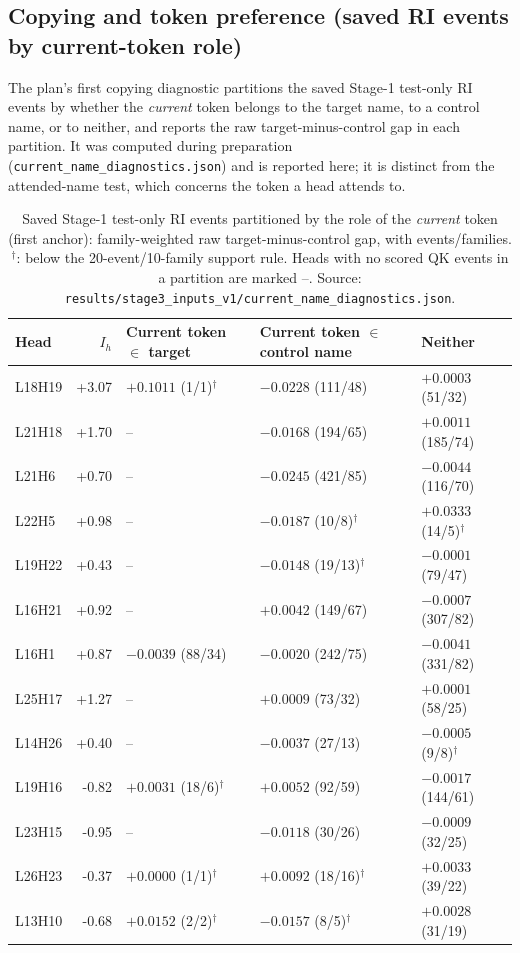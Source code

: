 \documentclass[11pt,a4paper]{article}
\begin{document}
\subsection{Copying and token preference (saved RI events by current-token role)}
\label{sec:current}
The plan's first copying diagnostic partitions the saved Stage-1 test-only RI events by
whether the \emph{current} token belongs to the target name, to a control name, or to
neither, and reports the raw target-minus-control gap in each partition. It was computed
during preparation (\texttt{current\_name\_diagnostics.json}) and is reported here; it
is distinct from the attended-name test, which concerns the token a head attends to.
\begin{table}[ht]
\centering\small
\begin{tabular}{lrlll}
\toprule
Head & $I_h$ & Current token $\in$ target & Current token $\in$ control name & Neither \\
\midrule
L18H19 & +3.07 & $+0.1011$ (1/1)$^{\dagger}$ & $-0.0228$ (111/48) & $+0.0003$ (51/32) \\
L21H18 & +1.70 & -- & $-0.0168$ (194/65) & $+0.0011$ (185/74) \\
L21H6 & +0.70 & -- & $-0.0245$ (421/85) & $-0.0044$ (116/70) \\
L22H5 & +0.98 & -- & $-0.0187$ (10/8)$^{\dagger}$ & $+0.0333$ (14/5)$^{\dagger}$ \\
L19H22 & +0.43 & -- & $-0.0148$ (19/13)$^{\dagger}$ & $-0.0001$ (79/47) \\
L16H21 & +0.92 & -- & $+0.0042$ (149/67) & $-0.0007$ (307/82) \\
L16H1 & +0.87 & $-0.0039$ (88/34) & $-0.0020$ (242/75) & $-0.0041$ (331/82) \\
L25H17 & +1.27 & -- & $+0.0009$ (73/32) & $+0.0001$ (58/25) \\
L14H26 & +0.40 & -- & $-0.0037$ (27/13) & $-0.0005$ (9/8)$^{\dagger}$ \\
L19H16 & -0.82 & $+0.0031$ (18/6)$^{\dagger}$ & $+0.0052$ (92/59) & $-0.0017$ (144/61) \\
L23H15 & -0.95 & -- & $-0.0118$ (30/26) & $-0.0009$ (32/25) \\
L26H23 & -0.37 & $+0.0000$ (1/1)$^{\dagger}$ & $+0.0092$ (18/16)$^{\dagger}$ & $+0.0033$ (39/22) \\
L13H10 & -0.68 & $+0.0152$ (2/2)$^{\dagger}$ & $-0.0157$ (8/5)$^{\dagger}$ & $+0.0028$ (31/19) \\
\bottomrule
\end{tabular}
\caption{Saved Stage-1 test-only RI events partitioned by the role of the \emph{current} token (first anchor): family-weighted raw target-minus-control gap, with events/families. $^{\dagger}$: below the 20-event/10-family support rule. Heads with no scored QK events in a partition are marked --. Source: \texttt{results/stage3\_inputs\_v1/current\_name\_diagnostics.json}.}
\label{tab:current}
\end{table}
\end{document}
